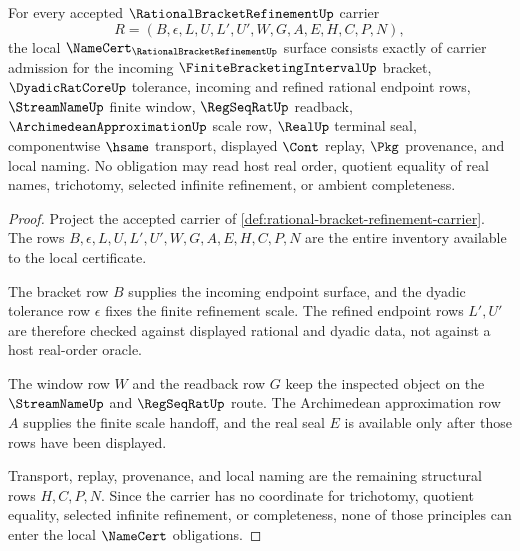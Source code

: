 \begin{theorem}
\label{thm:rational-bracket-refinement-namecert-obligations}
For every accepted $\RationalBracketRefinementUp$ carrier
$$
R=(B,\epsilon,L,U,L',U',W,G,A,E,H,C,P,N),
$$
the local $\NameCert_{\RationalBracketRefinementUp}$ surface consists exactly of carrier admission for the incoming $\FiniteBracketingIntervalUp$ bracket, $\DyadicRatCoreUp$ tolerance, incoming and refined rational endpoint rows, $\StreamNameUp$ finite window, $\RegSeqRatUp$ readback, $\ArchimedeanApproximationUp$ scale row, $\RealUp$ terminal seal, componentwise $\hsame$ transport, displayed $\Cont$ replay, $\Pkg$ provenance, and local naming. No obligation may read host real order, quotient equality of real names, trichotomy, selected infinite refinement, or ambient completeness.
\end{theorem}
\begin{proof}
Project the accepted carrier of \autoref{def:rational-bracket-refinement-carrier}. The rows $B,\epsilon,L,U,L',U',W,G,A,E,H,C,P,N$ are the entire inventory available to the local certificate.

The bracket row $B$ supplies the incoming endpoint surface, and the dyadic tolerance row $\epsilon$ fixes the finite refinement scale. The refined endpoint rows $L',U'$ are therefore checked against displayed rational and dyadic data, not against a host real-order oracle.

The window row $W$ and the readback row $G$ keep the inspected object on the $\StreamNameUp$ and $\RegSeqRatUp$ route. The Archimedean approximation row $A$ supplies the finite scale handoff, and the real seal $E$ is available only after those rows have been displayed.

Transport, replay, provenance, and local naming are the remaining structural rows $H,C,P,N$. Since the carrier has no coordinate for trichotomy, quotient equality, selected infinite refinement, or completeness, none of those principles can enter the local $\NameCert$ obligations.
\end{proof}

